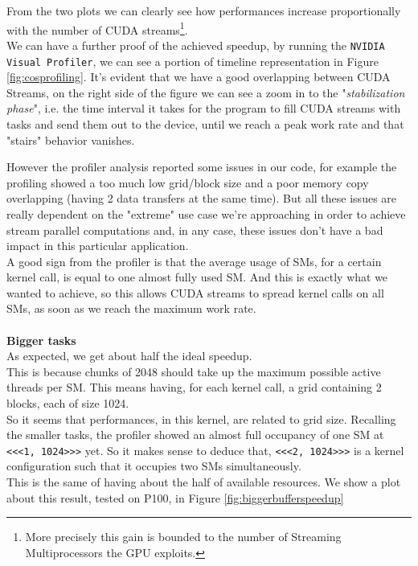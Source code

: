 	From the two plots we can clearly see how performances increase proportionally with the number of CUDA streams\footnote{More precisely this gain is bounded to the number of Streaming Multiprocessors the GPU exploits.}.\\
	We can have a further proof of the achieved speedup, by running the \texttt{NVIDIA Visual Profiler}, we can see a portion of timeline representation in Figure \ref{fig:cosprofiling}. It's evident that we have a good overlapping between CUDA Streams, on the right side of the figure we can see a zoom in to the "\textit{stabilization phase}", i.e. the time interval it takes for the program to fill CUDA streams with tasks and send them out to the device, until we reach a peak work rate and that "stairs" behavior vanishes.
	
	However the profiler analysis reported some issues in our code, for example the profiling showed a too much low grid/block size and a poor memory copy overlapping (having 2 data transfers at the same time). But all these issues are really dependent on the "extreme" use case we're approaching in order to achieve stream parallel computations and, in any case, these issues don't have a bad impact in this particular application.\\
	A good sign from the profiler is that the average usage of SMs, for a certain kernel call, is equal to one almost fully used SM. And this is exactly what we wanted to achieve, so this allows CUDA streams to spread kernel calls on all SMs, as soon as we reach the maximum work rate.\\\\
	{\large \textbf{Bigger tasks}}\\
	As expected, we get about half the ideal speedup.\\
	This is because chunks of 2048 should take up the maximum possible active threads per SM. This means having, for each kernel call, a grid containing 2 blocks, each of size 1024.\\
	So it seems that performances, in this kernel, are related to grid size. Recalling the smaller tasks, the profiler showed an almost full occupancy of one SM at \texttt{<<<1, 1024>>>} yet. So it makes sense to deduce that, \texttt{<<<2, 1024>>>} is a kernel configuration such that it occupies two SMs simultaneously. \\
	This is the same of having about the half of available resources.
	We show a plot about this result, tested on P100, in Figure \ref{fig:biggerbufferspeedup}
	
